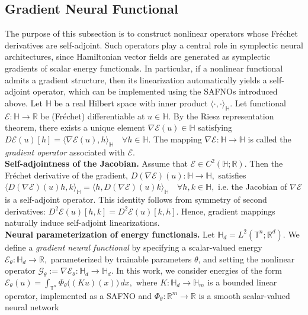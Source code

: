 \documentclass{article}
\theoremstyle{plain}
\theoremstyle{definition}
\theoremstyle{remark}
\newcommand{\inner}[2]{\langle #1, #2 \rangle}
\newcommand{\Hd}{\mathbb{H}_d}
\newcommand{\Hm}{\mathbb{H}_m}
\begin{document}
\subsection{Gradient Neural Functional}
The purpose of this subsection is to construct nonlinear operators whose
Fréchet derivatives are self-adjoint.
Such operators play a central role in symplectic neural architectures,
since Hamiltonian vector fields are generated as symplectic gradients
of scalar energy functionals.
In particular, if a nonlinear functional admits a gradient structure,
then its linearization automatically yields a self-adjoint operator,
which can be implemented using the SAFNOs introduced above.
Let $\mathbb{H}$ be a real Hilbert space with inner product $\inner{\cdot}{\cdot}_\mathbb{H}$.
Let functional
\(
\mathcal{E}:\mathbb{H}\to\mathbb{R}
\)
be (Fréchet) differentiable at $u\in\mathbb{H}$.
By the Riesz representation theorem, there exists a unique element
$\nabla\mathcal{E}(u)\in\mathbb{H}$ satisfying %
\(
D\mathcal{E}(u)[h]
=
\inner{\nabla\mathcal{E}(u)}{h}_\mathbb{H}
\quad
\forall h\in\mathbb{H}.
\)
The mapping
\(
\nabla\mathcal{E}:\mathbb{H}\to\mathbb{H}
\)
is called the \emph{gradient operator} associated with $\mathcal{E}$.\\
\textbf{Self-adjointness of the Jacobian.}
Assume that $\mathcal{E}\in C^2(\mathbb{H};\mathbb{R})$.
Then the Fréchet derivative of the gradient,
\(
D(\nabla\mathcal{E})(u):\mathbb{H}\to\mathbb{H},
\)
satisfies
\(
\inner{D(\nabla\mathcal{E})(u)h}{k}_\mathbb{H}
=
\inner{h}{D(\nabla\mathcal{E})(u)k}_\mathbb{H}
\quad
\forall h,k\in\mathbb{H},
\)
i.e. the Jacobian of $\nabla\mathcal{E}$ is a self-adjoint operator.
This identity follows from symmetry of second derivatives:
\(
D^2\mathcal{E}(u)[h,k]
=
D^2\mathcal{E}(u)[k,h].
\)
Hence, gradient mappings naturally induce self-adjoint linearizations.\\
\textbf{Neural parameterization of energy functionals.}
Let $\Hd=L^2(\mathbb{T}^n;\mathbb{R}^d)$.
We define a \emph{gradient neural functional} by specifying a scalar-valued energy
$
\mathcal{E}_\theta:\Hd\to\mathbb{R},
$
parameterized by trainable parameters $\theta$,
and setting the nonlinear operator
\(
\mathcal{G}_\theta := \nabla \mathcal{E}_\theta : \Hd \to \Hd.
\)
In this work, we consider energies of the form
\(
\mathcal{E}_\theta(u)
=
\int_{\mathbb{T}^n} \Phi_\theta\big( (Ku)(x) \big)\,dx,
\)
where
 $K:\Hd\to\Hm$ is a bounded linear operator, implemented as a SAFNO
and $\Phi_\theta:\mathbb{R}^m\to\mathbb{R}$ is a smooth scalar-valued neural network
\end{document}

